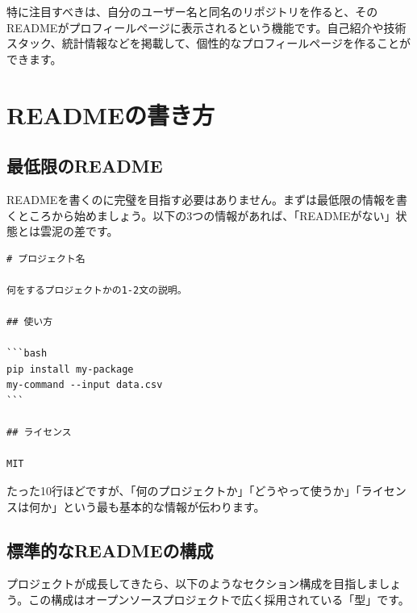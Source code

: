 特に注目すべきは、自分のユーザー名と同名のリポジトリを作ると、そのREADMEがプロフィールページに表示されるという機能です。自己紹介や技術スタック、統計情報などを掲載して、個性的なプロフィールページを作ることができます。

\section{READMEの書き方}

\subsection{最低限のREADME}

READMEを書くのに完璧を目指す必要はありません。まずは最低限の情報を書くところから始めましょう。以下の3つの情報があれば、「READMEがない」状態とは雲泥の差です。

\begin{lstlisting}[language={}]
# プロジェクト名

何をするプロジェクトかの1-2文の説明。

## 使い方

```bash
pip install my-package
my-command --input data.csv
```

## ライセンス

MIT
\end{lstlisting}

たった10行ほどですが、「何のプロジェクトか」「どうやって使うか」「ライセンスは何か」という最も基本的な情報が伝わります。

\subsection{標準的なREADMEの構成}

プロジェクトが成長してきたら、以下のようなセクション構成を目指しましょう。この構成はオープンソースプロジェクトで広く採用されている「型」です。

